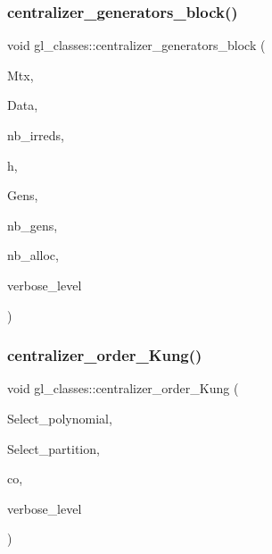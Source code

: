 \subsubsection{\texorpdfstring{centralizer\+\_\+generators\+\_\+block()}{centralizer\_generators\_block()}}
{\footnotesize\ttfamily void gl\+\_\+classes\+::centralizer\+\_\+generators\+\_\+block (\begin{DoxyParamCaption}\item[{\mbox{\hyperlink{galois_8h_a09fddde158a3a20bd2dcadb609de11dc}{I\+NT}} $\ast$}]{Mtx,  }\item[{\mbox{\hyperlink{classmatrix__block__data}{matrix\+\_\+block\+\_\+data}} $\ast$}]{Data,  }\item[{\mbox{\hyperlink{galois_8h_a09fddde158a3a20bd2dcadb609de11dc}{I\+NT}}}]{nb\+\_\+irreds,  }\item[{\mbox{\hyperlink{galois_8h_a09fddde158a3a20bd2dcadb609de11dc}{I\+NT}}}]{h,  }\item[{\mbox{\hyperlink{galois_8h_a09fddde158a3a20bd2dcadb609de11dc}{I\+NT}} $\ast$$\ast$\&}]{Gens,  }\item[{\mbox{\hyperlink{galois_8h_a09fddde158a3a20bd2dcadb609de11dc}{I\+NT}} \&}]{nb\+\_\+gens,  }\item[{\mbox{\hyperlink{galois_8h_a09fddde158a3a20bd2dcadb609de11dc}{I\+NT}} \&}]{nb\+\_\+alloc,  }\item[{\mbox{\hyperlink{galois_8h_a09fddde158a3a20bd2dcadb609de11dc}{I\+NT}}}]{verbose\+\_\+level }\end{DoxyParamCaption})}

\mbox{\label{classgl__classes_ad4d28f7a0ce1945d3d20c82f32c2671a}} 
\subsubsection{\texorpdfstring{centralizer\+\_\+order\+\_\+\+Kung()}{centralizer\_order\_Kung()}}
{\footnotesize\ttfamily void gl\+\_\+classes\+::centralizer\+\_\+order\+\_\+\+Kung (\begin{DoxyParamCaption}\item[{\mbox{\hyperlink{galois_8h_a09fddde158a3a20bd2dcadb609de11dc}{I\+NT}} $\ast$}]{Select\+\_\+polynomial,  }\item[{\mbox{\hyperlink{galois_8h_a09fddde158a3a20bd2dcadb609de11dc}{I\+NT}} $\ast$}]{Select\+\_\+partition,  }\item[{\mbox{\hyperlink{classlonginteger__object}{longinteger\+\_\+object}} \&}]{co,  }\item[{\mbox{\hyperlink{galois_8h_a09fddde158a3a20bd2dcadb609de11dc}{I\+NT}}}]{verbose\+\_\+level }\end{DoxyParamCaption})}


